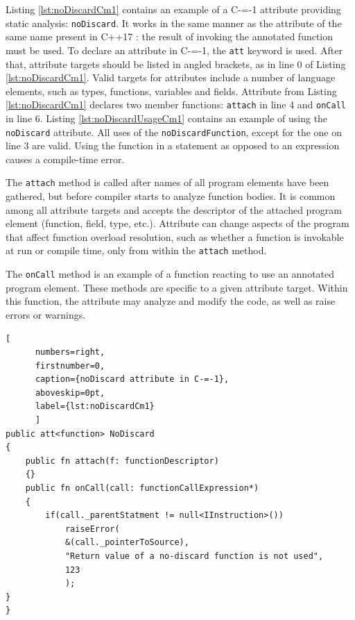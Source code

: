 Listing \ref{lst:noDiscardCm1} contains an example of a C-=-1 attribute providing static analysis: \lstinline{noDiscard}.
It works in the same manner as the attribute of the same name present in C++17 \cite{ISO:cpp17}: the result of invoking the annotated function must be used.
To declare an attribute in C-=-1, the \lstinline{att} keyword is used.
After that, attribute targets should be listed in angled brackets, as in line 0 of Listing \ref{lst:noDiscardCm1}.
Valid targets for attributes include a number of language elements, such as types, functions, variables and fields. Attribute from Listing \ref{lst:noDiscardCm1} declares two member functions: \lstinline{attach} in line 4 and \lstinline{onCall} in line 6.
Listing \ref{lst:noDiscardUsageCm1} contains an example of using the \lstinline{noDiscard} attribute.
All uses of the \lstinline|noDiscardFunction|, except for the one on line 3 are valid.
Using the function in a statement as opposed to an expression causes a compile-time error.

The \lstinline{attach} method is called after names of all program elements have been gathered, but before compiler starts to analyze function bodies.
It is common among all attribute targets and accepts the descriptor of the attached program element (function, field, type, etc.).
Attribute can change aspects of the program that affect function overload resolution, such as  whether a function is invokable at run or compile time, only from within the \lstinline{attach} method.

The \lstinline{onCall} method is an example of a function reacting to use an annotated program element.
These methods are specific to a given attribute target.
Within this function, the attribute may analyze and modify the code, as well as raise errors or warnings.

\begin{minipage}{\linewidth}

	\begin{lstlisting}[
	  numbers=right,
	  firstnumber=0,
	  caption={noDiscard attribute in C-=-1},
	  aboveskip=0pt,
	  label={lst:noDiscardCm1}
	  ]
public att<function> NoDiscard
{
	public fn attach(f: functionDescriptor)
	{}
	public fn onCall(call: functionCallExpression*)
	{
		if(call._parentStatment != null<IInstruction>())
			raiseError(
			&(call._pointerToSource),
			"Return value of a no-discard function is not used",
			123
			);
}
}
  \end{lstlisting}
\end{minipage}



